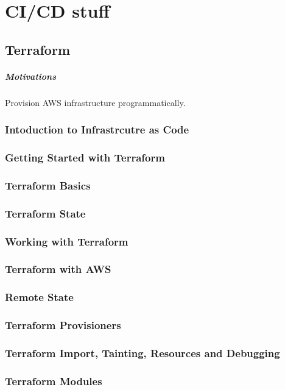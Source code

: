\documentclass[a4paper, 11pt]{book}
\begin{document}
    \chapter{CI/CD stuff}


    \section{Terraform}

    \paragraph{Motivations} Provision AWS infrastructure programmatically.

    \subsection{Intoduction to Infrastrcutre as Code}
    \subsection{Getting Started with Terraform}
    \subsection{Terraform Basics}
    \subsection{Terraform State}
    \subsection{Working with Terraform}
    \subsection{Terraform with AWS}
    \subsection{Remote State}
    \subsection{Terraform Provisioners}
    \subsection{Terraform Import, Tainting, Resources and Debugging}
    \subsection{Terraform Modules}
\end{document}
